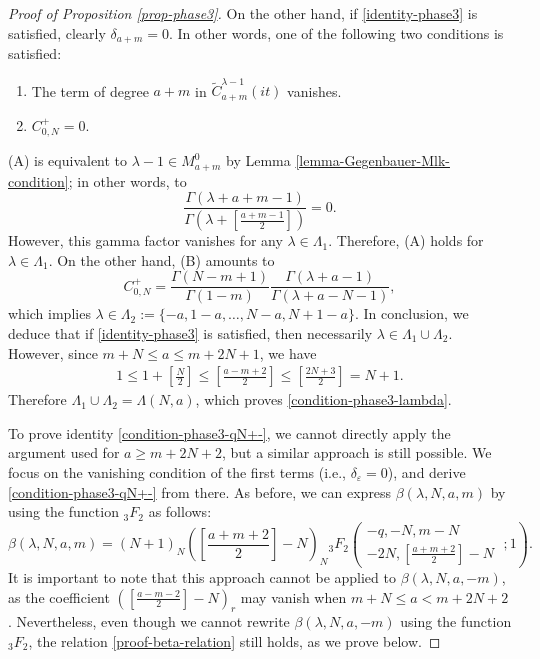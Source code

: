 \documentclass[12pt, pdflatex, a4paper]{article}
\theoremstyle{plain}
\theoremstyle{definition}
\def\Geg{\widetilde{C}}
\begin{document}
\begin{proof}[Proof of Proposition \ref{prop-phase3}]
On the other hand, if \eqref{identity-phase3} is satisfied, clearly $\delta_{a+m} = 0$. In other words, one of the following two conditions is satisfied:
\begin{enumerate}
\item[(A)] The term of degree $a+m$ in $\Geg_{a+m}^{\lambda-1}(it)$ vanishes.
\item[(B)] $C_{0, N}^+ = 0$.
\end{enumerate}
(A) is equivalent to $\lambda-1 \in M_{a+m}^0$ by Lemma \ref{lemma-Gegenbauer-Mlk-condition}; in other words, to
\begin{equation*}
\frac{\Gamma(\lambda+a+m-1)}{\Gamma(\lambda+\left[\frac{a+m-1}{2}\right])} = 0.
\end{equation*}
However, this gamma factor vanishes for any $\lambda \in \Lambda_1$. Therefore, (A) holds for $\lambda\in \Lambda_1$. On the other hand, (B) amounts to
\begin{equation*}
C_{0, N}^+ = \frac{\Gamma(N-m+1)}{\Gamma(1-m)}\frac{\Gamma(\lambda+a-1)}{\Gamma(\lambda+a-N-1)},
\end{equation*}
which implies $\lambda \in \Lambda_2 := \{-a, 1-a, \ldots, N-a, N+1-a\}$. In conclusion, we deduce that if \eqref{identity-phase3} is satisfied, then necessarily $\lambda \in \Lambda_1 \cup \Lambda_2$. However, since $m+N \leq a \leq m+2N+1$, we have
\begin{equation*}
\begin{aligned}
1 \leq 1+ \left[\frac{N}{2}\right] \leq \left[\frac{a-m+2}{2}\right] \leq \left[\frac{2N+3}{2}\right] = N+1.
\end{aligned}
\end{equation*}
Therefore $\Lambda_1 \cup \Lambda_2 = \Lambda(N,a)$, which proves \eqref{condition-phase3-lambda}. 

To prove identity \eqref{condition-phase3-qN+-}, we cannot directly apply the argument used for $a \geq m+2N+2$, but a similar approach is still possible. We focus on the vanishing condition of the first terms (i.e., $\delta_\varepsilon = 0$), and derive \eqref{condition-phase3-qN+-} from there.
As before, we can express $\beta(\lambda, N, a, m)$ by using the function ${}_3F_2$ as follows:
\begin{equation*}
\beta(\lambda, N, a, m) = (N+1)_N\left(\left[\frac{a+m+2}{2}\right] -N\right)_N  {}_3F_2\left(\begin{matrix}
-q, -N, m -N\\
-2N, \left[\frac{a+m+2}{2}\right]-N
\end{matrix}\; ; 1\right).
\end{equation*}
It is important to note that this approach cannot be applied to $\beta(\lambda, N, a, -m)$, as the coefficient $\left(\left[\frac{a-m-2}{2}\right] -N\right)_r$ may vanish when $m+N \leq a < m+2N+2$. Nevertheless, even though we cannot rewrite $\beta(\lambda, N, a, -m)$ using the function ${}_3F_2$, the relation \eqref{proof-beta-relation} still holds, as we prove below.


\end{proof}
\end{document}
